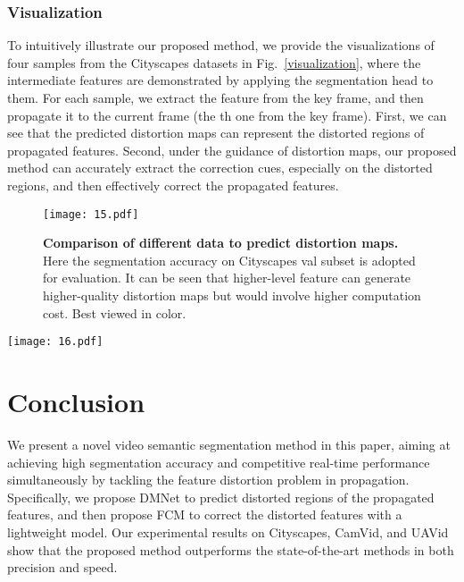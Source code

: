 \documentclass[journal]{IEEEtran}
\begin{document}
\subsubsection{Visualization}

To intuitively illustrate our proposed method, we provide the visualizations of four samples from the Cityscapes datasets in Fig.~\ref{visualization}, where the intermediate features are demonstrated by applying the segmentation head to them. For each sample, we extract the feature from the key frame, and then propagate it to the current frame (the th one from the key frame). First, we can see that the predicted distortion maps can represent the distorted regions of propagated features. Second, under the guidance of distortion maps, our proposed method can accurately extract the correction cues, especially on the distorted regions, and then effectively correct the propagated features.


\begin{figure}[t]
	\begin{center}
		\texttt{[image: 15.pdf]}
	\end{center}
	\caption{\textbf{Comparison of different data to predict distortion maps.} Here the segmentation accuracy on Cityscapes val subset is adopted for evaluation. It can be seen that higher-level feature can generate higher-quality distortion maps but would involve higher computation cost. Best viewed in color.}	
	\label{exp_distortion_input_with_computation}
\end{figure}

\begin{figure*}[t]
	\begin{center}
		\texttt{[image: 16.pdf]}
	\end{center}
	\caption{\textbf{Visualization of some samples from Cityscapes.} It can be seen that the predicted distortion map can represent the distortion pattern of propagated features, and our proposed method can effectively correct the distorted features. Red rectangles highlight the main distorted regions. Best viewed in color.}	
	\label{visualization}
\end{figure*}

\section{Conclusion} \label{sec:conclusion}
We present a novel video semantic segmentation method in this paper, aiming at achieving high segmentation accuracy and competitive real-time performance simultaneously by tackling the feature distortion problem in propagation. Specifically, we propose DMNet to predict distorted regions of the propagated features, and then propose FCM to correct the distorted features with a lightweight model. Our experimental results on Cityscapes, CamVid, and UAVid show that the proposed method outperforms the state-of-the-art methods in both precision and speed.
\end{document}
